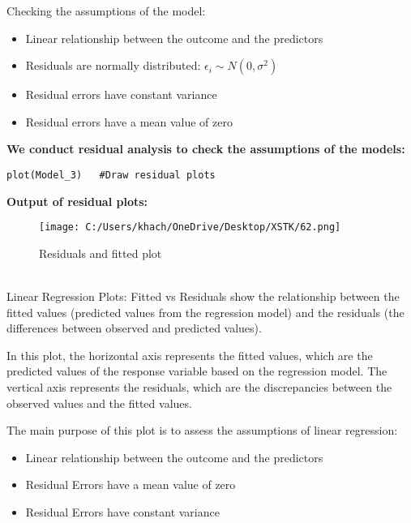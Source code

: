 \documentclass[a4paper]{article}
\begin{document}
	Checking the assumptions of the model:
	\begin{itemize}
		\item Linear relationship between the outcome and the predictors
		\item Residuals are normally distributed: $\epsilon_i \sim N(0, \sigma^2)$
		\item Residual errors have constant variance
		\item Residual errors have a mean value of zero
	\end{itemize}
	\textbf{We conduct residual analysis to check the assumptions of the models:}\\
	\begin{lstlisting}[frame=single, backgroundcolor=\color{gray!10}, breaklines=true, columns=fullflexible]
	plot(Model_3)   #Draw residual plots
	\end{lstlisting}
	\textbf{Output of residual plots:}
	\begin{figure}[htbp]
		\centering
		\begin{adjustbox}{width=0.7\textwidth, frame}
			\texttt{[image: C:/Users/khach/OneDrive/Desktop/XSTK/62.png]}
		\end{adjustbox}
		\captionsetup{justification=centering}
		\vspace{0.5cm}
		\caption{Residuals and fitted plot}
	\end{figure}
	\\Linear Regression Plots: Fitted vs Residuals show the relationship between the fitted values (predicted values from the regression model) and the residuals (the differences between observed and predicted values).
	
	In this plot, the horizontal axis represents the fitted values, which are the predicted values of the response variable based on the regression model. The vertical axis represents the residuals, which are the discrepancies between the observed values and the fitted values.
	
	The main purpose of this plot is to assess the assumptions of linear regression:
	\begin{itemize}
		\item Linear relationship between the outcome and the predictors
		\item Residual Errors have a mean value of zero
		\item Residual Errors have constant variance
	\end{itemize}
	
\end{document}
